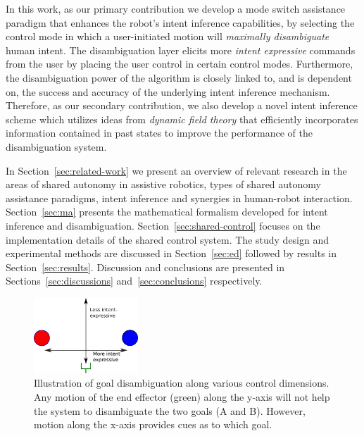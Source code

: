 In this work, as our primary contribution we develop a mode switch assistance paradigm that enhances the robot's intent inference capabilities, by selecting the control mode in which a user-initiated motion will \textit{maximally disambiguate} human intent. The disambiguation layer elicits more \textit{intent expressive} commands from the user by placing the user control in certain control modes. Furthermore, the disambiguation power of the algorithm is closely linked to, and is dependent on, the success and accuracy of the underlying intent inference mechanism. Therefore, as our secondary contribution, we also develop a novel intent inference scheme which utilizes ideas from \textit{dynamic field theory} that efficiently incorporates information contained in past states to improve the performance of the disambiguation system. 

In Section~\ref{sec:related-work} we present an overview of relevant research in the areas of shared autonomy in assistive robotics, types of shared autonomy assistance paradigms, intent inference and synergies in human-robot interaction. Section~\ref{sec:ma} presents the mathematical formalism developed for intent inference and disambiguation. Section~\ref{sec:shared-control} focuses on the implementation details of the shared control system. The study design and experimental methods are discussed in Section~\ref{sec:ed} followed by results in Section~\ref{sec:results}. Discussion and conclusions are presented in Sections~\ref{sec:discussions} and~\ref{sec:conclusions} respectively. 
\begin{figure}
	\begin{center}
		\includegraphics[width=0.35\textwidth]{./figures/Fig1_Disamb.eps}
	\end{center}
	\caption{Illustration of goal disambiguation along various control dimensions. Any motion of the end effector (green) along the y-axis will not help the system to disambiguate the two goals (A and B). However, motion along the x-axis provides cues as to which goal.}
	\label{fig:disamb}
\end{figure}



